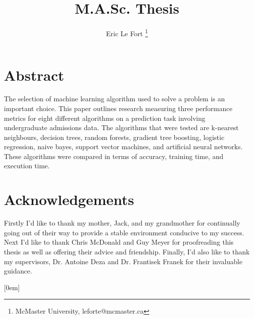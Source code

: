 \documentclass[12pt,twoside]{report}
\title{M.A.Sc. Thesis}
\author{Eric Le Fort
\thanks{McMaster University, leforte@mcmaster.ca}
}
\begin{document}
\pagestyle{empty}



\cleardoublepage
\pagestyle{fancy}



\chapter*{Abstract}
The selection of machine learning algorithm used to solve a problem is an important choice. This paper outlines research measuring three performance metrics for eight different algorithms on a prediction task involving undergraduate admissions data. The algorithms that were tested are k-nearest neighbours, decision trees, random forests, gradient tree boosting, logistic regression, naive bayes, support vector machines, and artificial neural networks. These algorithms were compared in terms of accuracy, training time, and execution time.



\newpage
\chapter*{Acknowledgements}
Firstly I'd like to thank my mother, Jack, and my grandmother for continually going out of their way to provide a stable environment conducive to my success. Next I'd like to thank Chris McDonald and Guy Meyer for proofreading this thesis as well as offering their advice and friendship. Finally, I'd also like to thank my supervisors, Dr. Antoine Deza and Dr. Frantisek Franek for their invaluable guidance.



\color{black}
\pagestyle{fancy}
\tableofcontents
\listoftables
\listoffigures

\newpage
\pagestyle{plain}
\pagestyle{fancy}


\setcounter{figure}{0}
\setcounter{equation}{0}
\setcounter{table}{0}

\setcounter{figure}{0}
\setcounter{equation}{0}
\setcounter{table}{0}

\setcounter{figure}{0}
\setcounter{equation}{0}
\setcounter{table}{0}

\setcounter{figure}{0}
\setcounter{equation}{0}
\setcounter{table}{0}

\setcounter{figure}{0}
\setcounter{equation}{0}
\setcounter{table}{0}




\makeatletter
\def\@makechapterhead#1{
  {\parindent \z@ \raggedright \normalfont
    \ifnum \c@secnumdepth >\m@ne
        \huge\bfseries \@chapapp\space \thechapter:\\[-3mm]
        #1
        \par\nobreak
    \fi
    \vskip 20\p@
  }}
\def\@makeschapterhead#1{
  {\parindent \z@ \raggedright
    \normalfont
    \interlinepenalty\@M
    \Huge \bfseries  #1\par\nobreak
    \vskip 20\p@
  }}
\makeatother
{}
  [0em]{}{\appendixname\ \contentslabel{0em}\ \hspace*{0.8em} }{}
  {\titlerule*[1pc]{}\contentspage}
  
\end{document}
